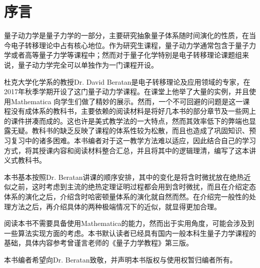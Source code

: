 
\chapter*{序言}
量子动力学是量子力学的一部分，主要研究抽象量子体系随时间演化的性质，在当今电子转移理论中占有核心地位。作为研究生课程，量子动力学通常包含于量子力学或者高等量子力学等课程中；然而对于量子化学特别是电子转移理论课题组来说，量子动力学完全可以单独作为一门课程开设。

杜克大学化学系的教授Dr. David Beratan是电子转移理论及应用领域的专家，在2017年秋季学期开设了这门量子动力学课程。在课堂上他举了大量的实例，并且使用Mathematica 向学生们做了精妙的展示。然而，一个不可回避的问题是这一课程没有成体系的教科书，主要依赖的阅读材料是将好几本书的部分章节及一些网上的课件拼凑而成的。这也许是美式教学法的一大特点，然而其效率低下的弊端也显露无疑。教科书的缺乏反映了课程的体系性较为松散，而且也造成了巩固知识、预习复习中的诸多困难。本书编者对于这一教学方法难以适应，因此结合自己的学习方式，将其授课内容和阅读材料整合汇总，并且将其中的逻辑理清，编写了这本讲义式教科书。

本书基本按照Dr. Beratan讲课的顺序安排，其中的变化是将含时微扰放在绝热近似之前，这时考虑到主流的绝热定理证明过程都会用到含时微扰，而且在介绍定态体系的演化之后，介绍含时哈密顿量体系的演化就自然而然。在介绍完一般性的处理方法之后，再介绍具体的两种极端情况下的近似，就显得更加合理。

阅读本书不需要具备使用Mathematica的能力，然而出于实用角度，可能会涉及到一些算法实现方面的考虑。本书默认读者已经具有国内一般本科生量子力学课程的基础，具体内容参考曾谨言老师的《量子力学教程》第三版。

本书编者希望向Dr. Beratan致敬，并声明本书版权与使用权暂归编者所有。


